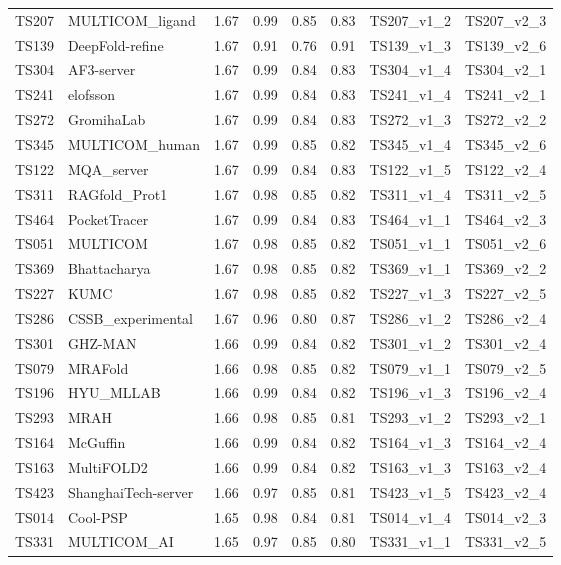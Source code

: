 \begin{table}[ht]
{\begin{tabular}{llllllll}
TS207 & MULTICOM\_ligand & 1.67 & 0.99 & 0.85 & 0.83 & TS207\_v1\_2 & TS207\_v2\_3 \\ 
TS139 & DeepFold-refine & 1.67 & 0.91 & 0.76 & 0.91 & TS139\_v1\_3 & TS139\_v2\_6 \\ 
TS304 & AF3-server & 1.67 & 0.99 & 0.84 & 0.83 & TS304\_v1\_4 & TS304\_v2\_1 \\ 
TS241 & elofsson & 1.67 & 0.99 & 0.84 & 0.83 & TS241\_v1\_4 & TS241\_v2\_1 \\ 
TS272 & GromihaLab & 1.67 & 0.99 & 0.84 & 0.83 & TS272\_v1\_3 & TS272\_v2\_2 \\ 
TS345 & MULTICOM\_human & 1.67 & 0.99 & 0.85 & 0.82 & TS345\_v1\_4 & TS345\_v2\_6 \\ 
TS122 & MQA\_server & 1.67 & 0.99 & 0.84 & 0.83 & TS122\_v1\_5 & TS122\_v2\_4 \\ 
TS311 & RAGfold\_Prot1 & 1.67 & 0.98 & 0.85 & 0.82 & TS311\_v1\_4 & TS311\_v2\_5 \\ 
TS464 & PocketTracer & 1.67 & 0.99 & 0.84 & 0.83 & TS464\_v1\_1 & TS464\_v2\_3 \\ 
TS051 & MULTICOM & 1.67 & 0.98 & 0.85 & 0.82 & TS051\_v1\_1 & TS051\_v2\_6 \\ 
TS369 & Bhattacharya & 1.67 & 0.98 & 0.85 & 0.82 & TS369\_v1\_1 & TS369\_v2\_2 \\ 
TS227 & KUMC & 1.67 & 0.98 & 0.85 & 0.82 & TS227\_v1\_3 & TS227\_v2\_5 \\ 
TS286 & CSSB\_experimental & 1.67 & 0.96 & 0.80 & 0.87 & TS286\_v1\_2 & TS286\_v2\_4 \\ 
TS301 & GHZ-MAN & 1.66 & 0.99 & 0.84 & 0.82 & TS301\_v1\_2 & TS301\_v2\_4 \\ 
TS079 & MRAFold & 1.66 & 0.98 & 0.85 & 0.82 & TS079\_v1\_1 & TS079\_v2\_5 \\ 
TS196 & HYU\_MLLAB & 1.66 & 0.99 & 0.84 & 0.82 & TS196\_v1\_3 & TS196\_v2\_4 \\ 
TS293 & MRAH & 1.66 & 0.98 & 0.85 & 0.81 & TS293\_v1\_2 & TS293\_v2\_1 \\ 
TS164 & McGuffin & 1.66 & 0.99 & 0.84 & 0.82 & TS164\_v1\_3 & TS164\_v2\_4 \\ 
TS163 & MultiFOLD2 & 1.66 & 0.99 & 0.84 & 0.82 & TS163\_v1\_3 & TS163\_v2\_4 \\ 
TS423 & ShanghaiTech-server & 1.66 & 0.97 & 0.85 & 0.81 & TS423\_v1\_5 & TS423\_v2\_4 \\ 
TS014 & Cool-PSP & 1.65 & 0.98 & 0.84 & 0.81 & TS014\_v1\_4 & TS014\_v2\_3 \\ 
TS331 & MULTICOM\_AI & 1.65 & 0.97 & 0.85 & 0.80 & TS331\_v1\_1 & TS331\_v2\_5 \\ 

\end{tabular}}
\end{table}
